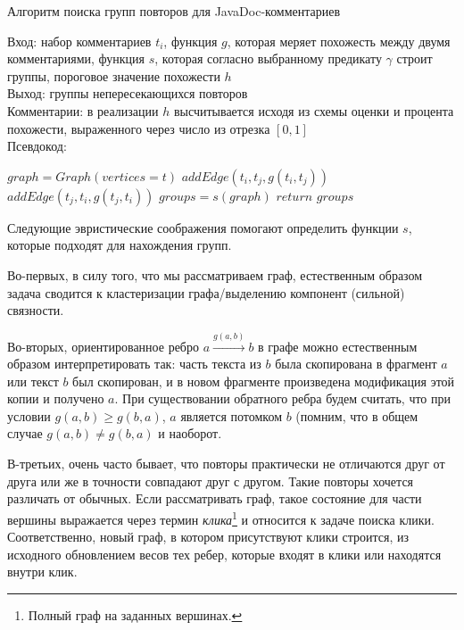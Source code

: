 \begin{algorithm}[h]
\caption{Алгоритм поиска групп повторов для JavaDoc-комментариев}\label{alg:groupDuplicate}
Вход: набор комментариев $t_{i}$, функция $g$, которая меряет похожесть между двумя комментариями, функция $s$, которая согласно выбранному предикату $\gamma$ строит группы, пороговое значение похожести $h$\\
Выход: группы непересекающихся повторов\\
Комментарии: в реализации $h$ высчитывается исходя из схемы оценки и процента похожести, выраженного через число из отрезка $[0,1]$\\
Псевдокод:
\begin{algorithmic}[1]
\State $graph = Graph(vertices=t)$
\State $addEdge(t_{i},t_{j},g(t_{i},t_{j}))$
\EndIf
{}
\State $addEdge(t_{j},t_{i},g(t_{j},t_{i}))$
\EndIf
\EndFor
\EndFor
\State $groups = s(graph)$
\State $return$ $groups$
\end{algorithmic}
\end{algorithm}


Следующие эвристические соображения помогают определить функции $s$, которые подходят для нахождения групп.

Во-первых, в силу того, что мы рассматриваем граф, естественным образом задача сводится к  кластеризации графа/выделению компонент (сильной) связности.

Во-вторых, ориентированное ребро $a \xrightarrow{g(a,b)} b$ в графе можно естественным образом интерпретировать так: часть текста из $b$ была скопирована в фрагмент $a$ или текст $b$ был скопирован, и в новом фрагменте произведена модификация этой копии и получено $a$.
При существовании обратного ребра будем считать, что при условии $g(a,b)\geq g(b,a)$, $a$ является потомком $b$ (помним, что в общем случае $g(a,b)\neq g(b,a)$ и наоборот.

В-третьих, очень часто бывает, что повторы практически не отличаются друг от друга или же в точности совпадают друг с другом.
Такие повторы хочется различать от обычных.
Если рассматривать граф, такое состояние для части вершины выражается через термин \emph{клика}\footnote{Полный граф на заданных вершинах.} и относится к задаче поиска клики.
Соответственно, новый граф, в котором присутствуют клики строится, из исходного обновлением весов тех ребер, которые входят в клики или находятся внутри клик.


